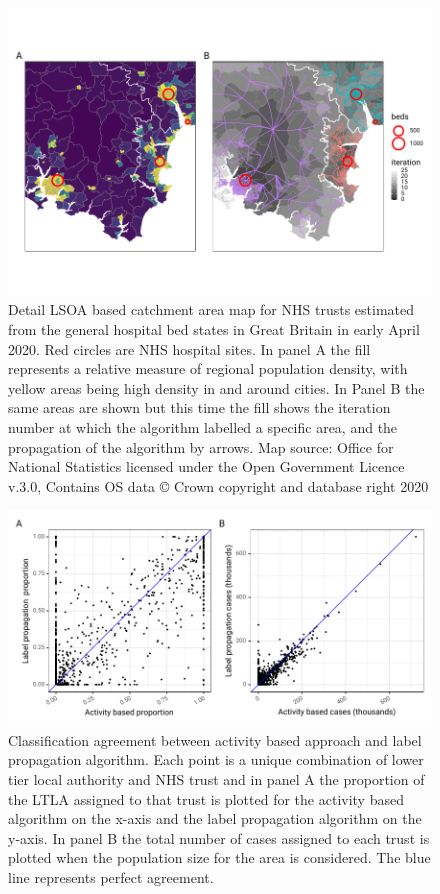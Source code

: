 \documentclass[twocolumn]{bmcart}%
\begin{document}
\begin{backmatter}
\begin{figure}[h!]
  \includegraphics{FIG3_HDU_Acute_SW_example}
  \caption{Detail LSOA based catchment area map for NHS trusts estimated from the general hospital bed states in Great 
Britain in early April 2020. Red circles are NHS hospital sites. In panel A the fill represents a relative measure of 
regional population density, with yellow areas being high density in and around cities. In Panel B the same areas are 
shown but this time the fill shows the iteration number at which the algorithm labelled a specific area, and the 
propagation of the algorithm by arrows. Map source: Office for National Statistics licensed under the Open Government 
Licence v.3.0, Contains OS data © Crown copyright and database right 2020}
  \label{fig:three}
\end{figure}

\begin{figure}[h!]
  \includegraphics{FIG4_prob_comparison_agreement}
  \caption{Classification agreement between activity based approach and label propagation algorithm. Each point is a 
unique combination of lower tier local authority and NHS trust and in panel A the proportion of the LTLA assigned to 
that trust is plotted for the activity based algorithm on the x-axis and the label propagation algorithm on the y-axis. 
In panel B the total number of cases assigned to each trust is plotted when the population size for the area is 
considered. The blue line represents perfect agreement.}
  \label{fig:four}
\end{figure}


\end{backmatter}
\end{document}

